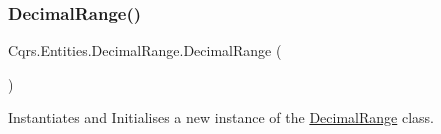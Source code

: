 \subsubsection{\texorpdfstring{Decimal\+Range()}{DecimalRange()}}
{\footnotesize\ttfamily Cqrs.\+Entities.\+Decimal\+Range.\+Decimal\+Range (\begin{DoxyParamCaption}{ }\end{DoxyParamCaption})}



Instantiates and Initialises a new instance of the \hyperlink{classCqrs_1_1Entities_1_1DecimalRange}{Decimal\+Range} class. 

